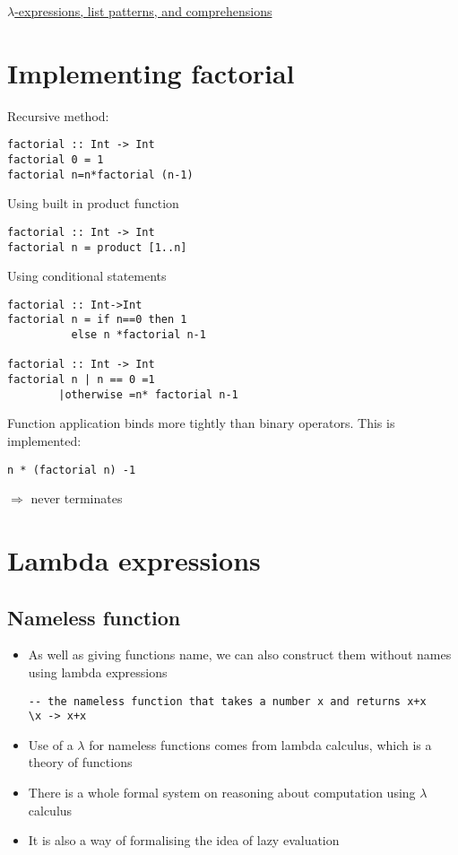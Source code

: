 \documentclass{article}[18pt]
\begin{document}
\begin{center}
\underline{\huge $\lambda$-expressions, list patterns, and comprehensions}
\end{center}
\section{Implementing factorial}
Recursive method:
\begin{verbatim}
factorial :: Int -> Int
factorial 0 = 1
factorial n=n*factorial (n-1)
\end{verbatim}
Using built in product function
\begin{verbatim}
factorial :: Int -> Int
factorial n = product [1..n]
\end{verbatim}
Using conditional statements
\begin{verbatim}
factorial :: Int->Int
factorial n = if n==0 then 1
	      else n *factorial n-1

factorial :: Int -> Int
factorial n | n == 0 =1
	    |otherwise =n* factorial n-1
\end{verbatim}
Function application binds more tightly than binary operators. This is implemented:
\begin{verbatim}
n * (factorial n) -1
\end{verbatim}
$\Rightarrow$ never terminates
\section{Lambda expressions}
\subsection{Nameless function}
\begin{itemize}
	\item As well as giving functions name, we can also construct them without names using lambda expressions
	\begin{verbatim}
-- the nameless function that takes a number x and returns x+x
\x -> x+x
	\end{verbatim}
	\item Use of a $\lambda$ for nameless functions comes from lambda calculus, which is a theory of functions
	\item There is a whole formal system on reasoning about computation using $\lambda$ calculus
	\item It is also a way of formalising the idea of lazy evaluation
	
\end{itemize}
\end{document}
